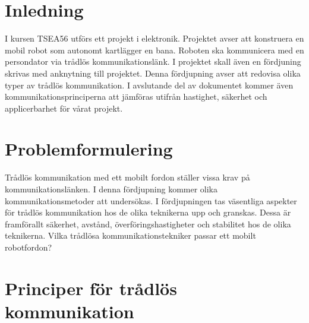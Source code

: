 \documentclass[a4paper,12pt,fleqn]{article}
\begin{document}
\addto\captionsswedish{\renewcommand{\contentsname}{Innehållsförteckning}}

\tableofcontents
\thispagestyle{fancy}
\newpage

\section{Inledning}
I kursen TSEA56 utförs ett projekt i elektronik. Projektet avser att konstruera en mobil robot som autonomt kartlägger en bana. Roboten ska kommunicera med en persondator via trådlös kommunikationslänk. I projektet skall även en fördjuning skrivas med anknytning till projektet. Denna fördjupning avser att redovisa olika typer av trådlös kommunikation. I avslutande del av dokumentet kommer även kommunikationsprinciperna att jämföras utifrån hastighet, säkerhet och applicerbarhet för vårat projekt. 

\section{Problemformulering}
Trådlös kommunikation med ett mobilt fordon ställer vissa krav på kommunikationslänken. I denna fördjupning kommer olika kommunikationsmetoder att undersökas. I fördjupningen tas väsentliga aspekter för trådlös kommunikation hos de olika teknikerna upp och granskas. Dessa är framförallt säkerhet, avstånd, överföringshastigheter och stabilitet hos de olika teknikerna. Vilka trådlösa kommunikationstekniker passar ett mobilt robotfordon?

\section{Principer för trådlös kommunikation}
\end{document}
